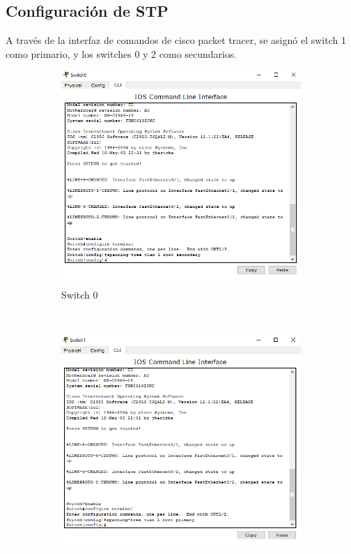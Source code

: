 \documentclass[spanish]{udpreport}
\begin{document}
\subsection{Configuración de STP}

A través de la interfaz de comandos de cisco packet tracer, se asignó el switch 1 como primario, y los switches 0 y 2 como secundarios.

\begin{figure}[htb]
    \centering
     \begin{subfigure}[b]{0.3\textwidth}
        \includegraphics[width=\textwidth]{photos/switch_0_secundario.png}
        \caption{Switch 0} \label{fig:photos/switch_0_secundario.png}
    \end{subfigure}
    ~
    \begin{subfigure}[b]{0.3\textwidth}
        \includegraphics[width=\textwidth]{photos/switch_1_primario.png}

\end{subfigure}
\end{figure}
\end{document}
